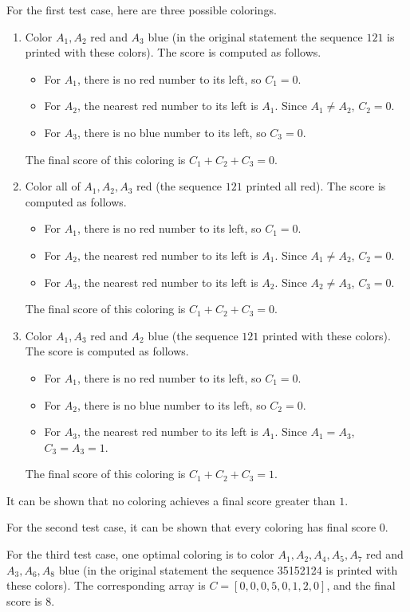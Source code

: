\documentclass[11pt]{article}
\begin{document}
For the first test case, here are three possible colorings.
\begin{enumerate}
\item Color $A_1, A_2$ red and $A_3$ blue (in the original statement the
sequence $121$ is printed with these colors).
The score is computed as follows.
\begin{itemize}
\item For $A_1$, there is no red number to its left, so $C_1 = 0$.
\item For $A_2$, the nearest red number to its left is $A_1$.
Since $A_1 \neq A_2$, $C_2 = 0$.
\item For $A_3$, there is no blue number to its left, so $C_3 = 0$.
\end{itemize}
The final score of this coloring is $C_1 + C_2 + C_3 = 0$.
\item Color all of $A_1, A_2, A_3$ red (the sequence $121$ printed all
red).
The score is computed as follows.
\begin{itemize}
\item For $A_1$, there is no red number to its left, so $C_1 = 0$.
\item For $A_2$, the nearest red number to its left is $A_1$.
Since $A_1 \neq A_2$, $C_2 = 0$.
\item For $A_3$, the nearest red number to its left is $A_2$.
Since $A_2 \neq A_3$, $C_3 = 0$.
\end{itemize}
The final score of this coloring is $C_1 + C_2 + C_3 = 0$.
\item Color $A_1, A_3$ red and $A_2$ blue (the sequence $121$ printed with
these colors).
The score is computed as follows.
\begin{itemize}
\item For $A_1$, there is no red number to its left, so $C_1 = 0$.
\item For $A_2$, there is no blue number to its left, so $C_2 = 0$.
\item For $A_3$, the nearest red number to its left is $A_1$.
Since $A_1 = A_3$, $C_3 = A_3 = 1$.
\end{itemize}
The final score of this coloring is $C_1 + C_2 + C_3 = 1$.
\end{enumerate}
It can be shown that no coloring achieves a final score greater than $1$.

For the second test case, it can be shown that every coloring has final
score $0$.

For the third test case, one optimal coloring is to color
$A_1, A_2, A_4, A_5, A_7$ red and $A_3, A_6, A_8$ blue (in the original
statement the sequence 35152124 is printed with these colors).
The corresponding array is $C = [0, 0, 0, 5, 0, 1, 2, 0]$, and the final
score is $8$.
\end{document}
